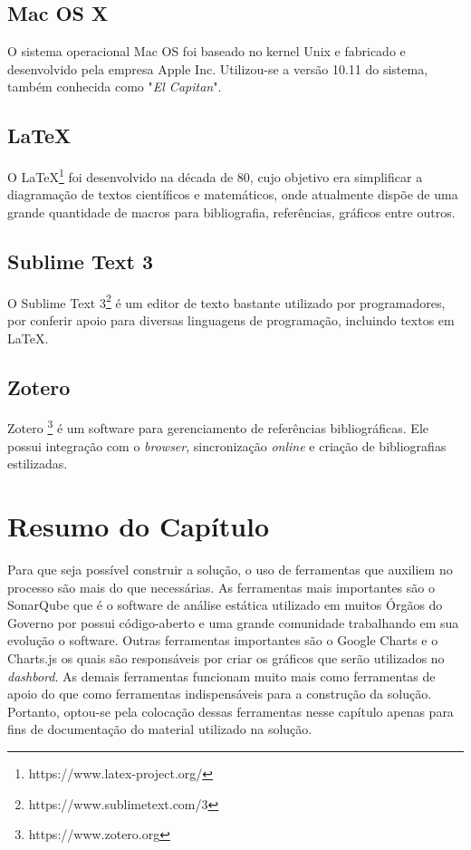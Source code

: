 	\subsection{Mac OS X} %
	\label{sub:Mac OS X}
		O sistema operacional Mac OS foi baseado no kernel Unix e fabricado e desenvolvido pela empresa Apple Inc. Utilizou-se a versão 10.11 do sistema, também conhecida como "\textit{El Capitan}".

	\subsection{LaTeX} %
	\label{sub:latex}
	
	O LaTeX\footnote{https://www.latex-project.org/} foi desenvolvido na década de 80, cujo objetivo era simplificar a diagramação de textos científicos e matemáticos, onde atualmente dispõe de uma grande quantidade de macros para bibliografia, referências, gráficos entre outros.

	\subsection{Sublime Text 3} %
	\label{sub:sublime_text_3}
		O Sublime Text 3\footnote{https://www.sublimetext.com/3} é um editor de texto bastante utilizado por programadores, por conferir apoio para diversas linguagens de programação, incluindo textos em LaTeX.

	\subsection{Zotero} %
	\label{sub:zotero}
		Zotero \footnote{https://www.zotero.org} é um software para gerenciamento de referências bibliográficas. Ele possui integração com o \textit{browser}, sincronização \textit{online} e criação de bibliografias estilizadas.
		
		
		
\section{Resumo do Capítulo}
Para que seja possível construir a solução, o uso de ferramentas que auxiliem no processo são mais do que necessárias. As ferramentas mais importantes são o SonarQube que é o software de análise estática utilizado em muitos Órgãos do Governo por possui código-aberto e uma grande comunidade trabalhando em sua evolução o software. Outras ferramentas importantes são o Google Charts e o Charts.js os quais são responsáveis por criar os gráficos que serão utilizados no \textit{dashbord}. As demais ferramentas funcionam muito mais como ferramentas de apoio do que como ferramentas indispensáveis para a construção da solução. Portanto, optou-se pela colocação dessas ferramentas nesse capítulo apenas para fins de documentação do material utilizado na solução.